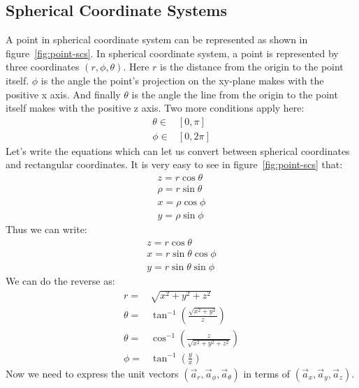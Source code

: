         \subsection{Spherical Coordinate Systems}
            
            A point in spherical coordinate system can be represented as shown in figure~\ref{fig:point-scs}.
            In spherical coordinate system, a point is represented by three coordinates $(r,\phi,\theta)$. Here $r$ is the distance from the origin to the point itself. $\phi$ is the angle the point's projection on the xy-plane makes with the positive x axis. And finally $\theta$ is the angle the line from the origin to the point itself makes with the positive z axis. Two more conditions apply here:
            \begin{align*}
                \theta \in & \left[0,\pi\right]\\
                \phi \in & \left[0, 2\pi\right]
            \end{align*}
            Let's write the equations which can let us convert between spherical coordinates and rectangular coordinates.
            It is very easy to see in figure~\ref{fig:point-scs} that:
            \begin{align*}
                z = r\cos\theta\\
                \rho = r\sin\theta\\
                x = \rho\cos\phi\\
                y = \rho\sin\phi
            \end{align*}
            Thus we can write:
            \begin{align}
                z = r\cos\theta\\
                x = r\sin\theta\cos\phi\\
                y = r\sin\theta\sin\phi
            \end{align}
            We can do the reverse as:
            \begin{align}
                r = & \sqrt{x^2+y^2+z^2}\\
                \theta = & \tan^{-1}\left(\frac{\sqrt{x^2+y^2}}{z}\right)\\
                \theta = & \cos^{-1}\left(\frac{z}{\sqrt{x^2+y^2+z^2}}\right)\\
                \phi = & \tan^{-1}\left(\frac{y}{x}\right)
            \end{align}
            Now we need to express the unit vectors $(\vec{a}_r, \vec{a}_\phi, \vec{a}_\theta)$ in terms of $(\vec{a}_x, \vec{a}_y, \vec{a}_z)$. 
